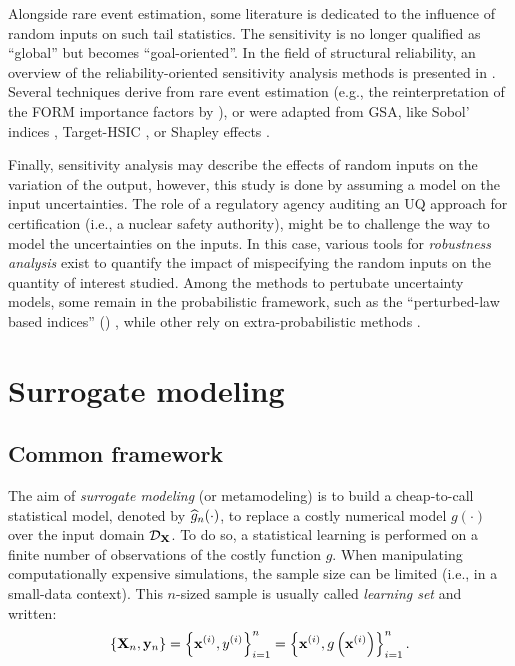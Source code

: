 Alongside rare event estimation, some literature is dedicated to the influence of random inputs on such tail statistics. 
The sensitivity is no longer qualified as ``global'' but becomes ``goal-oriented''. 
In the field of structural reliability, an overview of the reliability-oriented sensitivity analysis methods is presented in \citet{chabridon_2018_thesis}. 
Several techniques derive from rare event estimation (e.g., the reinterpretation of the FORM importance factors by \citet{papaioannou_2021_rosa_form}), or were adapted from GSA, like Sobol' indices \citep{wei_2012_rosa,chabridon_2018_thesis,perrin_2019_rosa,ehre_2020_rosa}, Target-HSIC \citep{marrel_chabridon_2021}, or Shapley effects \citep{ilidrissi_2021_rosa}.  

Finally, sensitivity analysis may describe the effects of random inputs on the variation of the output, however, this study is done by assuming a model on the input uncertainties. 
The role of a regulatory agency auditing an UQ approach for certification (i.e., a nuclear safety authority), might be to challenge the way to model the uncertainties on the inputs.  
In this case, various tools for \textit{robustness analysis} exist to quantify the impact of mispecifying the random inputs on the quantity of interest studied. 
Among the methods to pertubate uncertainty models, some remain in the probabilistic framework, such as the ``perturbed-law based indices'' () \citep{lemaitre_2015_PLI,iooss_2022_pli}, while other rely on extra-probabilistic methods \citep{ajenjo_2022_structural_safety}. 




\section{Surrogate modeling} \label{sec:surrogate}

\subsection{Common framework}

The aim of \textit{surrogate modeling} (or metamodeling) is to build a cheap-to-call statistical model, 
denoted by $\widehat{g}_n(\cdot)$, to replace a costly numerical model $g(\cdot)$ over the input domain $\mathcal{D}_{{\bf X}}$. 
To do so, a statistical learning is performed on a finite number of observations of the costly function $g$. 
When manipulating computationally expensive simulations, the sample size can be limited (i.e., in a small-data context). 
This $n$-sized sample is usually called \textit{learning set} and written: 
\begin{equation}
    \left\{{\bf X}_n, {\bf y}_n\right\} = \left\{{\bf x}^{(i)}, y^{(i)}\right\}_{i=1}^n
                                = \left\{{\bf x}^{(i)}, g\left({\bf x}^{(i)}\right)\right\}_{i=1}^n.    
\end{equation}


